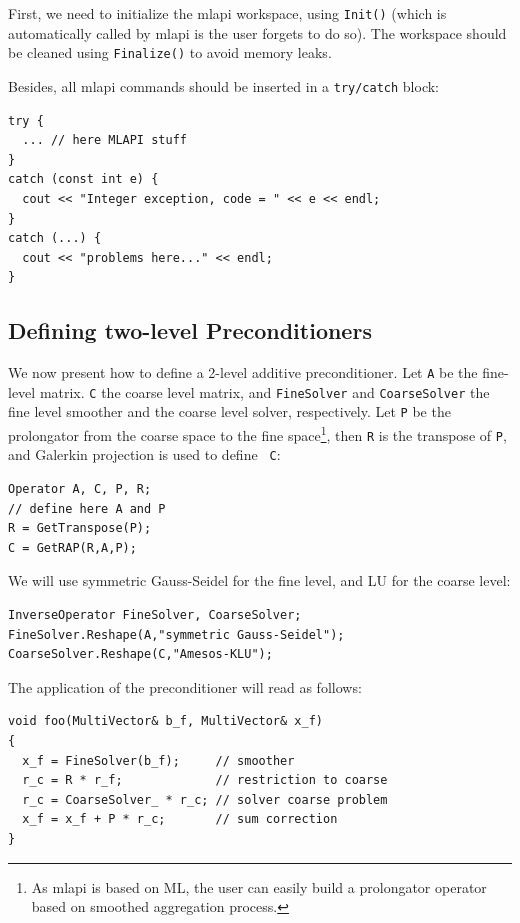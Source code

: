 \documentclass{article}[11pt]
\newcommand{\MLAPI}  {{\sc mlapi }}
\begin{document}
First, we need to initialize the \MLAPI workspace, using {\tt Init()} 
(which is automatically called by \MLAPI is the user forgets to do so). The
workspace should be cleaned using {\tt Finalize()} to avoid memory leaks.

Besides, all \MLAPI commands should be inserted
in a {\tt try/catch} block:
\begin{verbatim}
try {
  ... // here MLAPI stuff
}
catch (const int e) {
  cout << "Integer exception, code = " << e << endl;
} 
catch (...) {
  cout << "problems here..." << endl;
}
\end{verbatim}

\subsection{Defining two-level Preconditioners}
\label{sec:two-level}

We now present how to define a 2-level additive
preconditioner. Let {\tt A} be the fine-level matrix.
{\tt C}  the coarse level matrix,
and {\tt FineSolver} and {\tt CoarseSolver} 
the fine level smoother and the coarse level solver,
respectively. Let {\tt P} be the prolongator from the coarse space to the fine
space\footnote{As \MLAPI is based on ML, the user can easily build a
  prolongator operator based on smoothed aggregation process.}, then {\tt R}
  is the transpose of {\tt P}, and Galerkin projection is used to define {\tt
    C}:
\begin{verbatim}
Operator A, C, P, R;
// define here A and P
R = GetTranspose(P);
C = GetRAP(R,A,P);
\end{verbatim} 
We will use symmetric Gauss-Seidel
for the fine level, and LU for the coarse level:
\begin{verbatim}
InverseOperator FineSolver, CoarseSolver;
FineSolver.Reshape(A,"symmetric Gauss-Seidel");
CoarseSolver.Reshape(C,"Amesos-KLU");
\end{verbatim}
The application of the preconditioner will read as follows:
\begin{verbatim}
void foo(MultiVector& b_f, MultiVector& x_f)
{
  x_f = FineSolver(b_f);     // smoother
  r_c = R * r_f;             // restriction to coarse
  r_c = CoarseSolver_ * r_c; // solver coarse problem
  x_f = x_f + P * r_c;       // sum correction
}
\end{verbatim}
\end{document}
